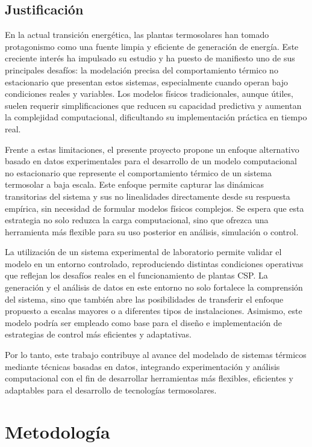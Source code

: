 \documentclass[11pt]{report}
\begin{document}
\section{Justificación}

En la actual transición energética, las plantas termosolares han tomado protagonismo como una fuente limpia y eficiente de generación de energía. Este creciente interés ha impulsado su estudio y ha puesto de manifiesto uno de sus principales desafíos: la modelación precisa del comportamiento térmico no estacionario que presentan estos sistemas, especialmente cuando operan bajo condiciones reales y variables. Los modelos físicos tradicionales, aunque útiles, suelen requerir simplificaciones que reducen su capacidad predictiva y aumentan la complejidad computacional, dificultando su implementación práctica en tiempo real. 

Frente a estas limitaciones, el presente proyecto propone un enfoque alternativo basado en datos experimentales para el desarrollo de un modelo computacional no estacionario que represente el comportamiento térmico de un sistema termosolar a baja escala. Este enfoque permite capturar las dinámicas transitorias del sistema y sus no linealidades directamente desde su respuesta empírica, sin necesidad de formular modelos físicos complejos. Se espera que esta estrategia no solo reduzca la carga computacional, sino que ofrezca una herramienta más flexible para su uso posterior en análisis, simulación o control.

La utilización de un sistema experimental de laboratorio permite validar el modelo en un entorno controlado, reproduciendo distintas condiciones operativas que reflejan los desafíos reales en el funcionamiento de plantas CSP. La generación y el análisis de datos en este entorno no solo fortalece la comprensión del sistema, sino que también abre las posibilidades de transferir el enfoque propuesto a escalas mayores o a diferentes tipos de instalaciones. Asimismo, este modelo podría ser empleado como base para el diseño e implementación de estrategias de control más eficientes y adaptativas. 

Por lo tanto, este trabajo contribuye al avance del modelado de sistemas térmicos mediante técnicas basadas en datos, integrando experimentación y análisis computacional con el fin de desarrollar herramientas más flexibles, eficientes y adaptables para el desarrollo de tecnologías termosolares.


\chapter{Metodología}
\end{document}
